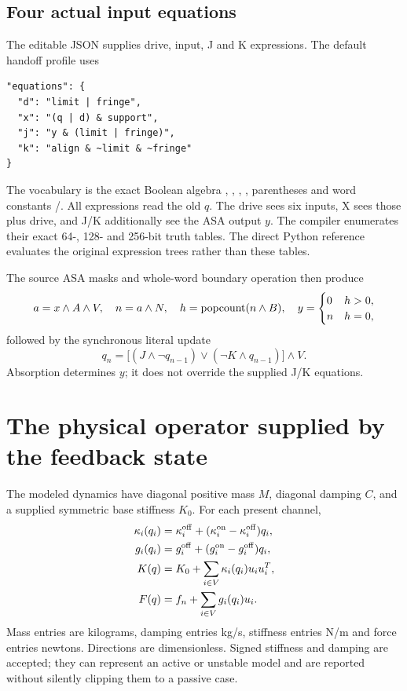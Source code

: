 \subsection{Four actual input equations}
The editable JSON supplies drive, input, J and K expressions. The default handoff profile uses
\begin{lstlisting}
"equations": {
  "d": "limit | fringe",
  "x": "(q | d) & support",
  "j": "y & (limit | fringe)",
  "k": "align & ~limit & ~fringe"
}
\end{lstlisting}
The vocabulary is the exact Boolean algebra \code{\&}, \code{|},
\code{\textasciicircum}, \code{\textasciitilde}, parentheses and word constants
/. All expressions read the old $q$. The drive sees six inputs,
X sees those plus drive, and J/K additionally see the ASA output $y$. The compiler
enumerates their exact 64-, 128- and 256-bit truth tables. The direct Python
reference evaluates the original expression trees rather than these tables.

The source ASA masks and whole-word boundary operation then produce
\begin{equation}
a=x\land A\land V,\quad n=a\land N,\quad h=\operatorname{popcount}(n\land B),\quad
y=\begin{cases}0&h>0,\\n&h=0,\end{cases}
\end{equation}
followed by the synchronous literal update
\begin{equation}
q_n=\big[(J\land\neg q_{n-1})\lor(\neg K\land q_{n-1})\big]\land V.
\end{equation}
Absorption determines $y$; it does not override the supplied J/K equations.
\clearpage

\section{The physical operator supplied by the feedback state}
The modeled dynamics have diagonal positive mass $M$, diagonal damping $C$,
and a supplied symmetric base stiffness $K_0$. For each present channel,
\begin{align}
\kappa_i(q_i)&=\kappa_i^{\rm off}
 +(\kappa_i^{\rm on}-\kappa_i^{\rm off})q_i,\\
g_i(q_i)&=g_i^{\rm off}+(g_i^{\rm on}-g_i^{\rm off})q_i,\\
K(q)&=K_0+\sum_{i\in V}\kappa_i(q_i)u_i u_i^T,\\
F(q)&=f_n+\sum_{i\in V}g_i(q_i)u_i.
\end{align}
Mass entries are kilograms, damping entries kg/s, stiffness entries N/m and force
entries newtons. Directions are dimensionless. Signed stiffness and damping
are accepted; they can represent an active or unstable model and are reported
without silently clipping them to a passive case.

